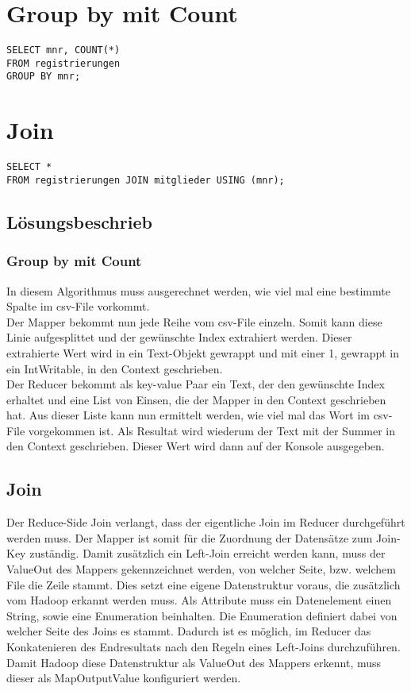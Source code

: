 \documentclass[a4paper,10pt,titlepage=false]{scrreprt}
\begin{document}
\section{Group by mit Count}
\begin{lstlisting}[style=sql]
SELECT mnr, COUNT(*)
FROM registrierungen
GROUP BY mnr;
\end{lstlisting}

\section{Join}
\begin{lstlisting}[style=sql]
SELECT *
FROM registrierungen JOIN mitglieder USING (mnr);
\end{lstlisting}


\subsection{Lösungsbeschrieb}
\subsubsection{Group by mit Count}
In diesem Algorithmus muss ausgerechnet werden, wie viel mal eine bestimmte Spalte im csv-File vorkommt.\\
Der Mapper bekommt nun jede Reihe vom csv-File einzeln. Somit kann diese Linie aufgesplittet und der gewünschte Index extrahiert werden. Dieser extrahierte Wert wird in ein Text-Objekt gewrappt und mit einer 1, gewrappt in ein IntWritable, in den Context geschrieben.\\
Der Reducer bekommt als key-value Paar ein Text, der den gewünschte Index erhaltet und eine List von Einsen, die der Mapper in den Context geschrieben hat. Aus dieser Liste kann nun ermittelt werden, wie viel mal das Wort im csv-File vorgekommen ist. Als Resultat wird wiederum der Text mit der Summer in den Context geschrieben. Dieser Wert wird dann auf der Konsole ausgegeben.
\subsection{Join}
Der Reduce-Side Join verlangt, dass der eigentliche Join im Reducer durchgeführt werden muss. Der Mapper ist somit für die Zuordnung der Datensätze zum Join-Key zuständig. Damit zusätzlich ein Left-Join erreicht werden kann, muss der ValueOut des Mappers gekennzeichnet werden, von welcher Seite, bzw. welchem File die Zeile stammt. Dies setzt eine eigene Datenstruktur voraus, die zusätzlich vom Hadoop erkannt werden muss. Als Attribute muss ein Datenelement einen String, sowie eine Enumeration beinhalten. Die Enumeration definiert dabei von welcher Seite des Joins es stammt. Dadurch ist es möglich, im Reducer das Konkatenieren des Endresultats nach den Regeln eines Left-Joins durchzuführen. Damit Hadoop diese Datenstruktur als ValueOut des Mappers erkennt, muss dieser als MapOutputValue konfiguriert werden.
\end{document}
